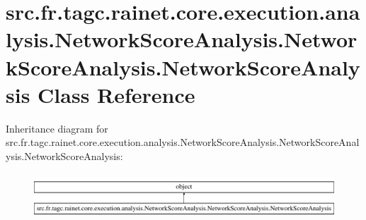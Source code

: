 \hypertarget{classsrc_1_1fr_1_1tagc_1_1rainet_1_1core_1_1execution_1_1analysis_1_1NetworkScoreAnalysis_1_1Netb8ffb1b7ba97f5d739cfb51f5ce47153}{\section{src.\-fr.\-tagc.\-rainet.\-core.\-execution.\-analysis.\-Network\-Score\-Analysis.\-Network\-Score\-Analysis.\-Network\-Score\-Analysis Class Reference}
\label{classsrc_1_1fr_1_1tagc_1_1rainet_1_1core_1_1execution_1_1analysis_1_1NetworkScoreAnalysis_1_1Netb8ffb1b7ba97f5d739cfb51f5ce47153}
}
Inheritance diagram for src.\-fr.\-tagc.\-rainet.\-core.\-execution.\-analysis.\-Network\-Score\-Analysis.\-Network\-Score\-Analysis.\-Network\-Score\-Analysis\-:\begin{figure}[H]
\begin{center}
\leavevmode
\includegraphics[height=1.725732cm]{classsrc_1_1fr_1_1tagc_1_1rainet_1_1core_1_1execution_1_1analysis_1_1NetworkScoreAnalysis_1_1Netb8ffb1b7ba97f5d739cfb51f5ce47153}
\end{center}
\end{figure}
